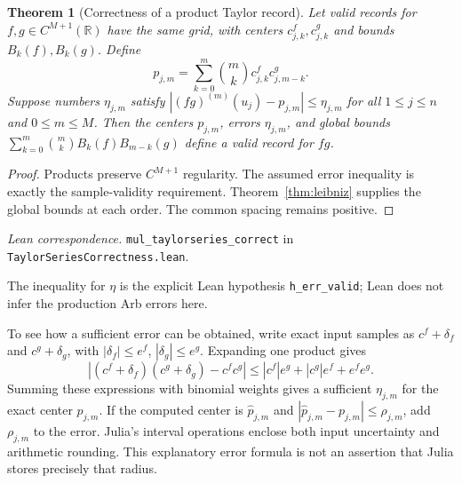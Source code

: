 \documentclass[11pt]{article}
\newtheorem{theorem}{Theorem}[section]
\theoremstyle{definition}
\theoremstyle{remark}
\newcommand{\R}{\mathbb R}
\newcommand{\code}[1]{\nolinkurl{#1}}
\newcommand{\leanref}[2]{\par\smallskip\noindent\textit{Lean correspondence.}
  \code{#1} in \code{#2}.\par\smallskip}
\numberwithin{equation}{section}
\begin{document}
\begin{theorem}[Correctness of a product Taylor record]
\label{thm:product-record}
Let valid records for $f,g\in C^{M+1}(\R)$ have the same grid, with centers
$c^f_{j,k},c^g_{j,k}$ and bounds $B_k(f),B_k(g)$. Define
\begin{equation}
 p_{j,m}=\sum_{k=0}^{m}\binom{m}{k}c^f_{j,k}c^g_{j,m-k}.
\end{equation}
Suppose numbers $\eta_{j,m}$ satisfy
$|(fg)^{(m)}(u_j)-p_{j,m}|\leq\eta_{j,m}$ for all
$1\leq j\leq n$ and $0\leq m\leq M$.
Then the centers $p_{j,m}$, errors $\eta_{j,m}$, and global bounds
$\sum_{k=0}^{m}\binom{m}{k}B_k(f)B_{m-k}(g)$ define a valid record for $fg$.
\end{theorem}
\begin{proof}
Products preserve $C^{M+1}$ regularity. The assumed error inequality is
exactly the sample-validity requirement. Theorem~\ref{thm:leibniz} supplies
the global bounds at each order. The common spacing remains positive.
\end{proof}
\leanref{mul_taylorseries_correct}{TaylorSeriesCorrectness.lean}
The inequality for $\eta$ is the explicit Lean hypothesis
\code{h_err_valid}; Lean does not infer the production Arb errors here.

To see how a sufficient error can be obtained, write exact input samples
as $c^f+\delta_f$ and $c^g+\delta_g$, with
$|\delta_f|\leq e^f$, $|\delta_g|\leq e^g$. Expanding one product gives
\begin{equation}
 |(c^f+\delta_f)(c^g+\delta_g)-c^fc^g|
 \leq |c^f|e^g+|c^g|e^f+e^fe^g.
\end{equation}
Summing these expressions with binomial weights gives a sufficient
$\eta_{j,m}$ for the exact center $p_{j,m}$. If the computed center is
$\widehat p_{j,m}$ and $|\widehat p_{j,m}-p_{j,m}|\leq\rho_{j,m}$,
add $\rho_{j,m}$ to the error. Julia's interval operations enclose both
input uncertainty and arithmetic rounding. This explanatory error formula
is not an assertion that Julia stores precisely that radius.
\end{document}
